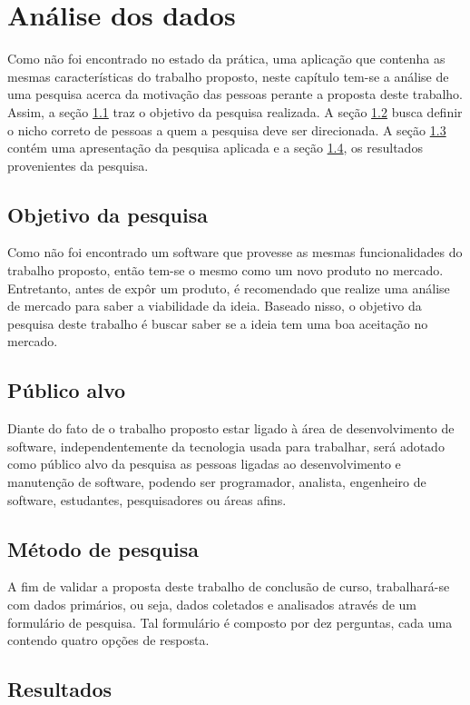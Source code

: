 \chapter{Análise dos dados}


Como não foi encontrado no estado da prática, uma aplicação que contenha as mesmas características do trabalho proposto, neste capítulo tem-se a análise de uma pesquisa acerca da motivação das pessoas perante a proposta deste trabalho. 
Assim, a seção \ref{objetivo_da_pesquisa} traz o objetivo da pesquisa realizada. 
A seção \ref{publico_alvo} busca definir o nicho correto de pessoas a quem a pesquisa deve ser direcionada. 
A seção \ref{pesquisa} contém uma apresentação da pesquisa aplicada 
e a seção \ref{resultados}, os resultados provenientes da pesquisa.


\section{Objetivo da pesquisa}\label{objetivo_da_pesquisa}


Como não foi encontrado um software que provesse as mesmas funcionalidades do trabalho proposto, então tem-se o mesmo como um novo produto no mercado. Entretanto, antes de expôr um produto, é recomendado que realize uma análise de mercado para saber a viabilidade da ideia. Baseado nisso, o objetivo da pesquisa deste trabalho é buscar saber se a ideia tem uma boa aceitação no mercado.


\section{Público alvo}\label{publico_alvo}


Diante do fato de o trabalho proposto estar ligado à área de desenvolvimento de software, independentemente da tecnologia usada para trabalhar, será adotado como público alvo da pesquisa as pessoas ligadas ao desenvolvimento e manutenção de software, podendo ser programador, analista, engenheiro de software, estudantes, pesquisadores ou áreas afins.


\section{Método de pesquisa}\label{pesquisa}


A fim de validar a proposta deste trabalho de conclusão de curso, trabalhará-se com dados primários, ou seja, dados coletados e analisados através de um formulário de pesquisa. Tal formulário é composto por dez perguntas, cada uma contendo quatro opções de resposta.


\section{Resultados}\label{resultados}


